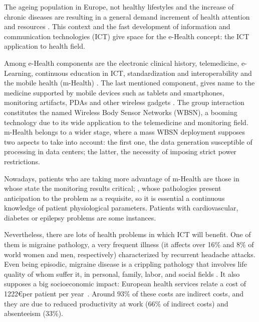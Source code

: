 \label{chapter:introduction}

The ageing population in Europe, not healthy lifestyles and the increase of chronic diseases are resulting in a general demand increment of health attention and resources \cite{pmid18843167}. This context and the fast development of information and communication technologies (ICT) give space for the e-Health concept: the ICT application to health field.

Among e-Health components are the electronic clinical history, telemedicine, e-Learning,  continuous education in ICT, standardization and interoperability and the mobile health (m-Health) \cite{OPSOMSEstrategia}. The last mentioned component, gives name to the medicine supported by mobile devices such as tablets and smartphones, monitoring artifacts, PDAs and other wireless gadgets \cite{kay2011mhealth}. The group interaction constitutes the named Wireless Body Sensor Networks (WBSN), a booming technology due to its wide application to the telemedicine and monitoring field. m-Health belongs to a wider stage, where a mass WBSN deployment supposes two aspects to take into account: the first one, the data generation susceptible of processing in data centers; the latter, the necessity of imposing strict power restrictions.

Nowadays, patients who are taking more advantage of m-Health are those in whose state the monitoring results critical; \ie, whose pathologies present anticipation to the problem as a requisite, so it is essential a continuous knowledge of patient physiological parameters. Patients with cardiovascular, diabetes or epilepsy problems are some instances.

Nevertheless, there are lots of health problems in which ICT will benefit. One of them is migraine pathology, a very frequent illness (it affects over 16\% and 8\% of world women and men, respectively) characterized by recurrent headache attacks. Even being episodic, migraine disease is a crippling pathology that involves life quality of whom suffer it, in personal, family, labor, and social fields \cite{SENmigsinaura}. It also supposes a big socioeconomic impact: European health services relate a cost of 1222\euro per patient per year~\cite{Linde:2012:CostMigraineEU}. Around $93\%$ of these costs are indirect costs, and they are due to reduced productivity at work ($66\%$ of indirect costs) and absenteeism ($33\%$).

